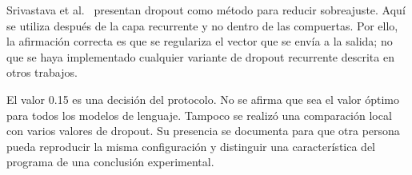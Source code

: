 Srivastava et al.~\cite{srivastava2014} presentan dropout como método para reducir sobreajuste. Aquí se utiliza después de la capa recurrente y no dentro de las compuertas. Por ello, la afirmación correcta es que se regulariza el vector que se envía a la salida; no que se haya implementado cualquier variante de dropout recurrente descrita en otros trabajos.

El valor 0.15 es una decisión del protocolo. No se afirma que sea el valor óptimo para todos los modelos de lenguaje. Tampoco se realizó una comparación local con varios valores de dropout. Su presencia se documenta para que otra persona pueda reproducir la misma configuración y distinguir una característica del programa de una conclusión experimental.
